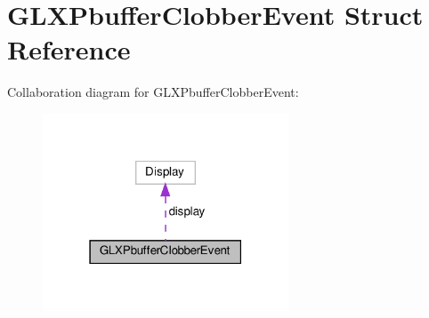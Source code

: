 \hypertarget{structGLXPbufferClobberEvent}{}\section{G\+L\+X\+Pbuffer\+Clobber\+Event Struct Reference}
\label{structGLXPbufferClobberEvent}


Collaboration diagram for G\+L\+X\+Pbuffer\+Clobber\+Event\+:
\nopagebreak
\begin{figure}[H]
\begin{center}
\leavevmode
\includegraphics[width=207pt]{structGLXPbufferClobberEvent__coll__graph}
\end{center}
\end{figure}
